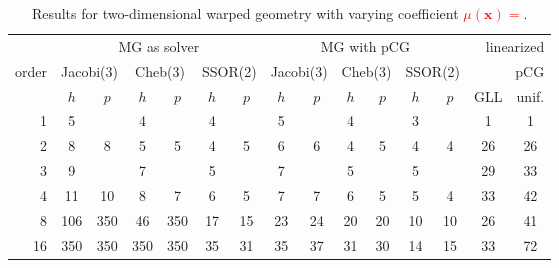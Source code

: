 \documentclass[smallcondensed,final]{svjour3}     %
\newcommand{\todo}[1]{\textcolor{red}{\bf #1}}
\newcommand{\bs}[1]{\ensuremath{\boldsymbol #1}}
\begin{document}
\begin{table}
  \caption{\label{tab:2d-fan} Results for two-dimensional warped geometry
    with varying coefficient \todo{$\mu(\bs x) =$}.}
  \centering
  \begin{tabular}{|r|c c|c c|c c||c c|c c|c c||c c|} 
    \hline
    & \multicolumn{6}{c||}{MG as solver} & \multicolumn{6}{c||}{MG with pCG} & \multicolumn{2}{r|}{linearized} \\
    \cline{2-13}
    \!\!\! order \!\!\!\! &  \multicolumn{2}{c|}{\!\scriptsize  Jacobi(3)\!} &  \multicolumn{2}{c|}{\!\scriptsize Cheb(3)\!} & \multicolumn{2}{c||}{\!\scriptsize  SSOR(2)\!} & \multicolumn{2}{c|}{\!\scriptsize Jacobi(3)\!} &  \multicolumn{2}{c|}{\!\scriptsize Cheb(3)\!} & \multicolumn{2}{c||}{\!\scriptsize SSOR(2)\!} & \multicolumn{2}{r|}{pCG}\\
\hline
 & $h$ & $p$ & $h$ & $p$& $h$ & $p$& $h$ & $p$& $h$ & $p$& $h$ & $p$& GLL & unif.\\
 \cline{2-15}
1 & 5 & & 4 & & 4 & & 5 & & 4 & & 3 & & 1 & 1  \\
2 & 8 & 8 & 5 & 5 & 4 & 5 & 6 & 6 & 4 & 5 & 4 & 4 & 26 & 26 \\
3 & 9 & & 7 & & 5 & & 7 & & 5 & & 5 & & 29 & 33  \\
4 & 11 & 10 & 8 & 7 & 6 & 5 & 7 & 7 & 6 & 5 & 5 & 4 & 33 & 42 \\
8 & 106 & 350 & 46 & 350 & 17 & 15 & 23 & 24 & 20 & 20 & 10 & 10 & 26 & 41 \\
16 & 350 & 350 & 350 & 350 & 35 & 31 & 35 & 37 & 31 & 30 & 14 & 15 & 33 & 72 \\
\hline
  \end{tabular}
\end{table}
\end{document}
